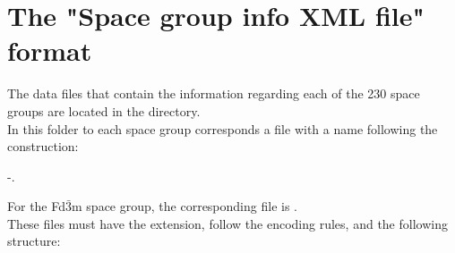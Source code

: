 \section*{The  "Space group info XML file" format}

The data files that contain the information regarding each of the 230 space groups are located in the  directory. \\
In this folder to each space group corresponds a file with a name following the construction: 
\begin{center} -.\end{center}
For the Fd$\bar{3}$m space group, the corresponding file is . \\
These files must have the  extension, follow the  encoding rules, and the following structure:\\
\sglxml
